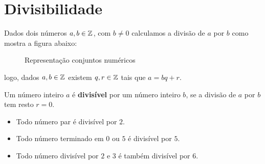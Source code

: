 
\chapter{Divisibilidade}

 Dados dois números $a, b \in \mathbb{Z}$, com $b \neq 0$ calculamos a divisão de $a$ por $b$ como mostra a figura abaixo:

  \begin{figure}[H]
   \centering
   \caption{Representação conjuntos numéricos}
  \end{figure}

 logo, dados $a, b \in \mathbb{Z}$ existem $q, r \in \mathbb{Z}$ tais que $a= bq + r$.

 \vskip0.3cm

 \colorbox{azul}{
 \begin{minipage}{0.9\linewidth}
 \begin{center}
  Um número inteiro $a$ é \textbf{divisível} por um número inteiro $b$, se a divisão de $a$ por $b$ tem resto $r= 0$.
 \end{center}
 \end{minipage}}

 \vskip0.3cm

 \begin{exem}
 \begin{itemize}
 \item Todo número par é divisível por $2$.
 \item Todo número terminado em $0$ ou $5$ é divisível por $5$.
 \item Todo número divisível por $2$ e $3$ é também divisível por $6$.
 \end{itemize}
 \end{exem}

